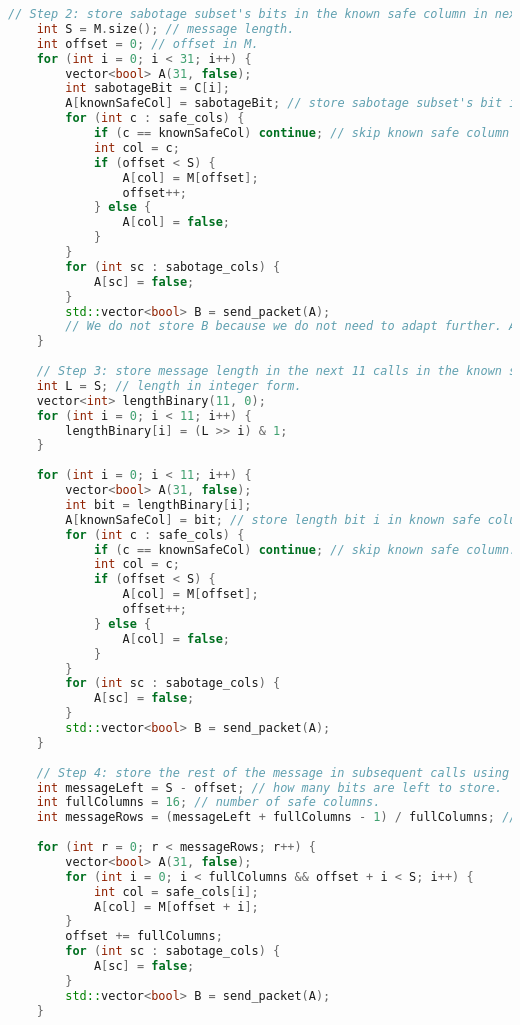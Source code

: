 \begin{lstlisting}[language=C++]
    // Step 2: store sabotage subset's bits in the known safe column in next 31 calls. The other 15 safe columns store message bits if available.
    int S = M.size(); // message length.
    int offset = 0; // offset in M.
    for (int i = 0; i < 31; i++) {
        vector<bool> A(31, false);
        int sabotageBit = C[i];
        A[knownSafeCol] = sabotageBit; // store sabotage subset's bit i in known safe column.
        for (int c : safe_cols) {
            if (c == knownSafeCol) continue; // skip known safe column because we used it for sabotage subset.
            int col = c;
            if (offset < S) {
                A[col] = M[offset];
                offset++;
            } else {
                A[col] = false;
            }
        }
        for (int sc : sabotage_cols) {
            A[sc] = false;
        }
        std::vector<bool> B = send_packet(A);
        // We do not store B because we do not need to adapt further. Actually, we can store B if we want to adapt but the solution does not require further adaptation.
    }
 
    // Step 3: store message length in the next 11 calls in the known safe column. The other 15 safe columns store more message bits if available.
    int L = S; // length in integer form.
    vector<int> lengthBinary(11, 0);
    for (int i = 0; i < 11; i++) {
        lengthBinary[i] = (L >> i) & 1;
    }
 
    for (int i = 0; i < 11; i++) {
        vector<bool> A(31, false);
        int bit = lengthBinary[i];
        A[knownSafeCol] = bit; // store length bit i in known safe column.
        for (int c : safe_cols) {
            if (c == knownSafeCol) continue; // skip known safe column.
            int col = c;
            if (offset < S) {
                A[col] = M[offset];
                offset++;
            } else {
                A[col] = false;
            }
        }
        for (int sc : sabotage_cols) {
            A[sc] = false;
        }
        std::vector<bool> B = send_packet(A);
    }
 
    // Step 4: store the rest of the message in subsequent calls using all 16 safe columns.
    int messageLeft = S - offset; // how many bits are left to store.
    int fullColumns = 16; // number of safe columns.
    int messageRows = (messageLeft + fullColumns - 1) / fullColumns; // how many rows needed.
 
    for (int r = 0; r < messageRows; r++) {
        vector<bool> A(31, false);
        for (int i = 0; i < fullColumns && offset + i < S; i++) {
            int col = safe_cols[i];
            A[col] = M[offset + i];
        }
        offset += fullColumns;
        for (int sc : sabotage_cols) {
            A[sc] = false;
        }
        std::vector<bool> B = send_packet(A);
    }
 

\end{lstlisting}
